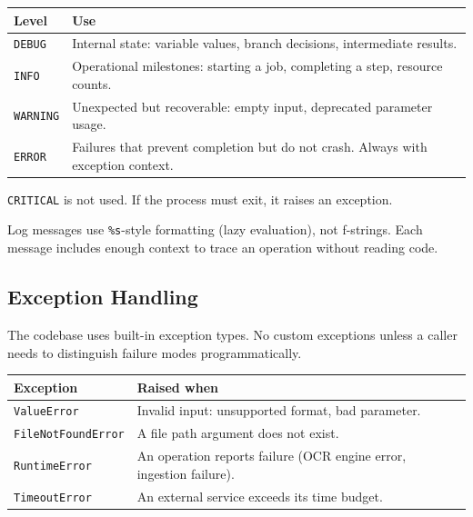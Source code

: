 \documentclass[a4paper,10pt]{article}
\begin{document}
\begin{center}
\begin{tabular}{lp{8cm}}
\toprule
\textbf{Level} & \textbf{Use} \\
\midrule
\texttt{DEBUG}   & Internal state: variable values, branch decisions,
                   intermediate results. \\
\texttt{INFO}    & Operational milestones: starting a job, completing
                   a step, resource counts. \\
\texttt{WARNING} & Unexpected but recoverable: empty input, deprecated
                   parameter usage. \\
\texttt{ERROR}   & Failures that prevent completion but do not crash.
                   Always with exception context. \\
\bottomrule
\end{tabular}
\end{center}

\texttt{CRITICAL} is not used.  If the process must exit, it raises an
exception.

Log messages use \texttt{\%s}-style formatting (lazy evaluation), not
f-strings.  Each message includes enough context to trace an operation
without reading code.

\subsection{Exception Handling}

The codebase uses built-in exception types.  No custom exceptions
unless a caller needs to distinguish failure modes programmatically.

\begin{center}
\begin{tabular}{lp{8cm}}
\toprule
\textbf{Exception} & \textbf{Raised when} \\
\midrule
\texttt{ValueError}       & Invalid input: unsupported format, bad
                            parameter. \\
\texttt{FileNotFoundError} & A file path argument does not exist. \\
\texttt{RuntimeError}      & An operation reports failure (OCR engine
                            error, ingestion failure). \\
\texttt{TimeoutError}      & An external service exceeds its time
                            budget. \\
\bottomrule
\end{tabular}
\end{center}
\end{document}
